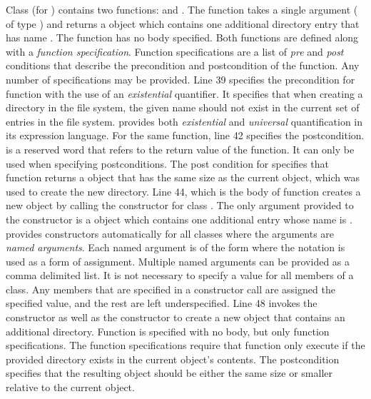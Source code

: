 Class  (for ) contains two functions:
 and . The  function takes a
single argument ( of type ) and returns a
 object which contains one additional directory entry that
has name . The  function has no body
specified. Both functions are defined along with a {\em function
  specification}. Function specifications are a list of {\em pre} and
{\em post} conditions that describe the precondition and postcondition
of the function. Any number of specifications may be provided. Line 39
specifies the precondition for function  with the use of
an {\em existential} quantifier. It specifies that when creating a
directory in the file system, the given name  should not exist
in the current set of entries in the file system. \Klang{} provides
both {\em existential} and {\em universal} quantification in its
expression language. For the same function, line 42 specifies the
postcondition.  is a reserved word that refers to the
return value of the function. It can only be used when specifying
postconditions. The post condition for  specifies that
function  returns a  object that has the same
size as the current  object, which was used to create the new
directory. Line 44, which is the body of function  creates
a new  object by calling the constructor for class
. The only argument provided to the constructor is a
 object which contains one additional  entry whose
name is . \Klang{} provides constructors automatically for all
classes where the arguments are {\em named arguments}. Each named
argument is of the form  where the \code{::}
notation is used as a form of assignment. Multiple named arguments can
be provided as a comma delimited list. It is not necessary to specify
a value for all members of a class. Any members that are specified in
a constructor call are assigned the specified value, and the rest are
left underspecified.  Line 48 invokes the  constructor as
well as the  constructor to create a new  object
that contains an additional directory. Function  is
specified with no body, but only function specifications. The function
specifications require that function  only execute if the
provided directory  exists in the current object's
contents. The postcondition specifies that the resulting 
object should be either the same size or smaller relative to the
current object.


